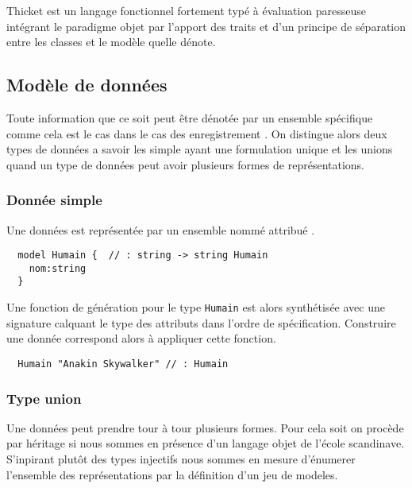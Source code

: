 \documentclass[twoside,a4paper]{article}
\begin{document}
Thicket  est  un  langage  fonctionnel  fortement  typé  à  évaluation
paresseuse  intégrant  le  paradigme  objet par  l'apport  des  traits
\cite{trait} et  d'un principe de  séparation entre les classes  et le
modèle quelle dénote.

\subsection{Modèle de données}

Toute  information que  ce  soit  peut être  dénotée  par un  ensemble
spécifique  comme cela  est  le  cas dans  le  cas des  enregistrement
\cite{RecordCalculus}.  On distingue  alors  deux types  de données  a
savoir les simple ayant une formulation  unique et les unions quand un
type de données peut avoir plusieurs formes de représentations.

\subsubsection{Donnée simple}

Une   données  est   représentée  par   un  ensemble   nommé  attribué
\cite{Cardelli} \cite{Haskell}. 

\lstset{language=Thicket}
\begin{lstlisting}
  model Humain {  // : string -> string Humain
    nom:string   
  }
\end{lstlisting}

Une  fonction  de génération  pour  le  type  {\tt Humain}  est  alors
synthétisée avec  une signature  calquant le  type des  attributs dans
l'ordre de  spécification.  Construire  une donnée correspond  alors à
appliquer cette fonction.

\lstset{language=Thicket}
\begin{lstlisting}
  Humain "Anakin Skywalker" // : Humain
\end{lstlisting}

\subsubsection{Type union}

Une données peut prendre tour à  tour plusieurs formes. Pour cela soit
on procède par héritage si nous  sommes en présence d'un langage objet
de  l'école scandinave.  S'inpirant  plutôt des  types injectifs  nous
sommes  en mesure  d'énumerer  l'ensemble des  représentations par  la
définition d'un jeu de modeles.
\end{document}
